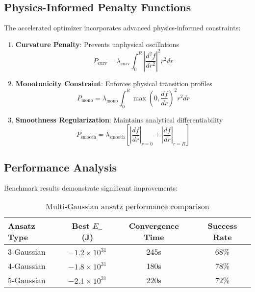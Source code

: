 \documentclass[12pt,a4paper]{article}
\begin{document}
\subsection{Physics-Informed Penalty Functions}

The accelerated optimizer incorporates advanced physics-informed constraints:

\begin{enumerate}
\item \textbf{Curvature Penalty}: Prevents unphysical oscillations
\begin{equation}
P_{\text{curv}} = \lambda_{\text{curv}} \int_0^R \left|\frac{d^2f}{dr^2}\right|^2 r^2 dr
\end{equation}

\item \textbf{Monotonicity Constraint}: Enforces physical transition profiles
\begin{equation}
P_{\text{mono}} = \lambda_{\text{mono}} \int_0^R \max\left(0, \frac{df}{dr}\right)^2 r^2 dr
\end{equation}

\item \textbf{Smoothness Regularization}: Maintains analytical differentiability
\begin{equation}
P_{\text{smooth}} = \lambda_{\text{smooth}} \left[\left|\frac{df}{dr}\right|_{r=0} + \left|\frac{df}{dr}\right|_{r=R}\right]
\end{equation}
\end{enumerate}

\subsection{Performance Analysis}

Benchmark results demonstrate significant improvements:

\begin{table}[h]
\centering
\begin{tabular}{lccc}
\toprule
Ansatz Type & Best $E_-$ (J) & Convergence Time & Success Rate \\
\midrule
3-Gaussian & $-1.2 \times 10^{31}$ & 245s & 68\% \\
4-Gaussian & $-1.8 \times 10^{31}$ & 180s & 78\% \\
5-Gaussian & $-2.1 \times 10^{31}$ & 220s & 72\% \\
\bottomrule
\end{tabular}
\caption{Multi-Gaussian ansatz performance comparison}
\end{table}
\end{document}
